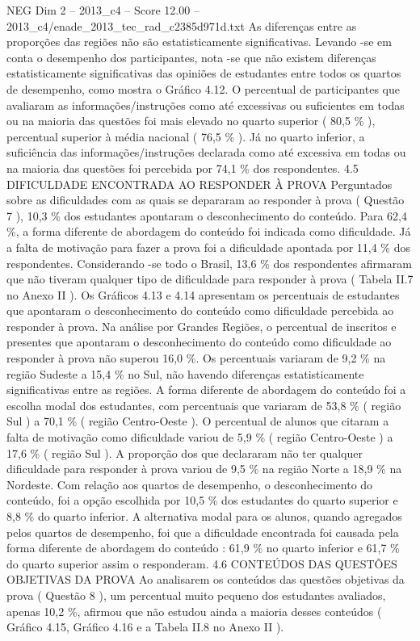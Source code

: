 \begin{textsample}{NEG Dim 2 – 2013\_c4 – Score 12.00 – 2013\_c4/enade\_2013\_tec\_rad\_c2385d971d.txt}
As diferenças entre as proporções das regiões não são estatisticamente significativas.
Levando -se em conta o desempenho dos participantes, nota -se que não existem diferenças estatisticamente significativas das opiniões de estudantes entre todos os quartos de desempenho, como mostra o Gráfico 4.12.
O percentual de participantes que avaliaram as informações/instruções como até excessivas ou suficientes em todas ou na maioria das questões foi mais elevado no quarto superior ( 80,5 \% ), percentual superior à média nacional ( 76,5 \% ).
Já no quarto inferior, a suficiência das informações/instruções declarada como até excessiva em todas ou na maioria das questões foi percebida por 74,1 \% dos respondentes. 4.5 DIFICULDADE ENCONTRADA AO RESPONDER À PROVA Perguntados sobre as dificuldades com as quais se depararam ao responder à prova ( Questão 7 ), 10,3 \% dos estudantes apontaram o desconhecimento do conteúdo.
Para 62,4 \%, a forma diferente de abordagem do conteúdo foi indicada como dificuldade.
Já a falta de motivação para fazer a prova foi a dificuldade apontada por 11,4 \% dos respondentes.
Considerando -se todo o Brasil, 13,6 \% dos respondentes afirmaram que não tiveram qualquer tipo de dificuldade para responder à prova ( Tabela II.7 no Anexo II ).
Os Gráficos 4.13 e 4.14 apresentam os percentuais de estudantes que apontaram o desconhecimento do conteúdo como dificuldade percebida ao responder à prova.
Na análise por Grandes Regiões, o percentual de inscritos e presentes que apontaram o desconhecimento do conteúdo como dificuldade ao responder à prova não superou 16,0 \%.
Os percentuais variaram de 9,2 \% na região Sudeste a 15,4 \% no Sul, não havendo diferenças estatisticamente significativas entre as regiões.
A forma diferente de abordagem do conteúdo foi a escolha modal dos estudantes, com percentuais que variaram de 53,8 \% ( região Sul ) a 70,1 \% ( região Centro-Oeste ).
O percentual de alunos que citaram a falta de motivação como dificuldade variou de 5,9 \% ( região Centro-Oeste ) a 17,6 \% ( região Sul ).
A proporção dos que declararam não ter qualquer dificuldade para responder à prova variou de 9,5 \% na região Norte a 18,9 \% na Nordeste.
Com relação aos quartos de desempenho, o desconhecimento do conteúdo, foi a opção escolhida por 10,5 \% dos estudantes do quarto superior e 8,8 \% do quarto inferior.
A alternativa modal para os alunos, quando agregados pelos quartos de desempenho, foi que a dificuldade encontrada foi causada pela forma diferente de abordagem do conteúdo : 61,9 \% no quarto inferior e 61,7 \% do quarto superior assim o responderam. 4.6 CONTEÚDOS DAS QUESTÕES OBJETIVAS DA PROVA Ao analisarem os conteúdos das questões objetivas da prova ( Questão 8 ), um percentual muito pequeno dos estudantes avaliados, apenas 10,2 \%, afirmou que não estudou ainda a maioria desses conteúdos ( Gráfico 4.15, Gráfico 4.16 e a Tabela II.8 no Anexo II ).

\end{textsample}
